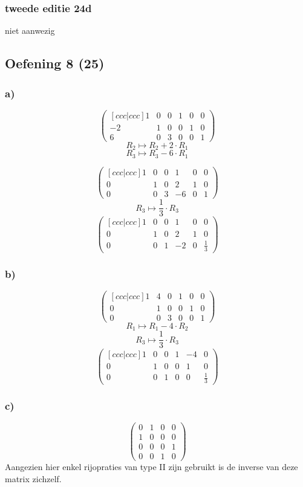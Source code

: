 \documentclass[lineaire_algebra_oplossingen.tex]{subfiles}
\begin{document}
\subsubsection*{tweede editie 24d}
niet aanwezig

\subsection{Oefening 8 (25)}
\subsubsection*{a)}
$$
\begin{pmatrix}[ccc|ccc]
 1 & 0 & 0 & 1 & 0 & 0\\
-2 & 1 & 0 & 0 & 1 & 0\\ 
 6 & 0 & 3 & 0 & 0 & 1 
\end{pmatrix}
$$
$$R_2 \longmapsto R_2 + 2\cdot R_1$$
$$R_3 \longmapsto R_3 - 6\cdot R_1$$

$$
\begin{pmatrix}[ccc|ccc]
 1 & 0 & 0 & 1 & 0 & 0\\
 0 & 1 & 0 & 2 & 1 & 0\\ 
 0 & 0 & 3 & -6 & 0 & 1 
\end{pmatrix}
$$
$$R_3 \longmapsto \frac{1}{3}\cdot R_3$$
$$
\begin{pmatrix}[ccc|ccc]
 1 & 0 & 0 & 1 & 0 & 0\\
 0 & 1 & 0 & 2 & 1 & 0\\ 
 0 & 0 & 1 & -2 & 0 & \frac{1}{3} 
\end{pmatrix}
$$
\subsubsection*{b)}

$$
\begin{pmatrix}[ccc|ccc]
1 & 4 & 0 & 1 & 0 & 0\\
0 & 1 & 0 & 0 & 1 & 0\\
0 & 0 & 3 & 0 & 0 & 1
\end{pmatrix}
$$
$$R_1 \longmapsto R_1 - 4\cdot R_2$$
$$R_3 \longmapsto \frac{1}{3}\cdot R_3$$
$$
\begin{pmatrix}[ccc|ccc]
1 & 0 & 0 & 1 & -4 & 0\\
0 & 1 & 0 & 0 & 1 & 0\\
0 & 0 & 1 & 0 & 0 & \frac{1}{3}
\end{pmatrix}
$$

\subsubsection*{c)}
$$
\begin{pmatrix}
0 & 1 & 0 & 0\\
1 & 0 & 0 & 0\\
0 & 0 & 0 & 1\\
0 & 0 & 1 & 0
\end{pmatrix}
$$
Aangezien hier enkel rijopraties van type II zijn gebruikt is de inverse van deze matrix zichzelf.
\end{document}
